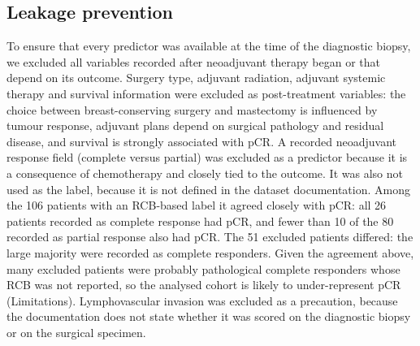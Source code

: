 \documentclass[10pt,a4paper,twocolumn]{article}
\begin{document}
\subsection{Leakage prevention}
To ensure that every predictor was available at the time of the diagnostic biopsy, we excluded all variables recorded after neoadjuvant therapy began or that depend on its outcome. Surgery type, adjuvant radiation, adjuvant systemic therapy and survival information were excluded as post-treatment variables: the choice between breast-conserving surgery and mastectomy is influenced by tumour response, adjuvant plans depend on surgical pathology and residual disease, and survival is strongly associated with pCR. A recorded neoadjuvant response field (complete versus partial) was excluded as a predictor because it is a consequence of chemotherapy and closely tied to the outcome. It was also not used as the label, because it is not defined in the dataset documentation. Among the 106 patients with an RCB-based label it agreed closely with pCR: all 26 patients recorded as complete response had pCR, and fewer than 10 of the 80 recorded as partial response also had pCR. The 51 excluded patients differed: the large majority were recorded as complete responders. Given the agreement above, many excluded patients were probably pathological complete responders whose RCB was not reported, so the analysed cohort is likely to under-represent pCR (Limitations). Lymphovascular invasion was excluded as a precaution, because the documentation does not state whether it was scored on the diagnostic biopsy or on the surgical specimen.
\end{document}
